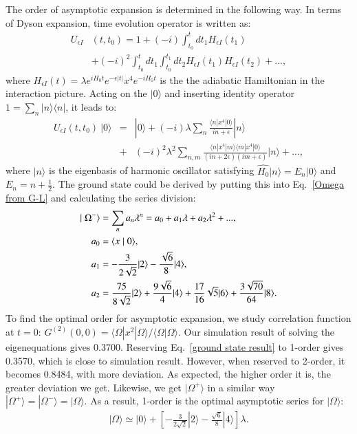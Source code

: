 \documentclass[twocolumn,pra,aps,superscriptaddress]{revtex4-2}
\begin{document}
The order of asymptotic expansion is determined in the following way. In terms of Dyson expansion, time evolution operator is written as:
\begin{align*}
U_{\epsilon I}&(t,t_{0})=1+(-i)\int_{t_{0}}^{t}dt_{1}H_{\epsilon I}(t_{1})
\\
&+(-i)^{2}\int_{t_{0}}^{t}dt_{1}\int_{t_{0}}^{t_{1}}dt_{2}H_{\epsilon I}(t_{1})H_{\epsilon I}(t_{2})+...,
\end{align*} 
where $H_{\epsilon I}(t)=\lambda e^{iH_{0}t}e^{-\epsilon\left|t\right|}x^{4}e^{-iH_{0}t}$ is the the adiabatic Hamiltonian in the interaction picture. Acting on the $|0\rangle$ and inserting identity operator $1=\sum_n |n\rangle \langle n|$, it leads to:
\begin{eqnarray*}
\label{time evolution operator}
U_{\epsilon I}(t,t_{0})~|0\rangle &=& |0\rangle  + (-i)\lambda \sum_n \frac{\langle n |x^4|0\rangle}{in+\epsilon}|n\rangle \nonumber\\&+&(-i)^2 \lambda^2 \sum_{n,m} \frac{\langle n |x^4|m\rangle\langle m |x^4|0\rangle}{\left(in+2\epsilon \right) \left(im+\epsilon \right)}|n\rangle+...,
\end{eqnarray*} 
where $|n\rangle$ is the eigenbasis of harmonic oscillator satisfying $\hat{H_0}|n\rangle=E_n |0\rangle$ and $E_n = n+\frac{1}{2}$. 
The ground state could be derived by putting this into Eq.~\eqref{Omega from G-L} and calculating the series division:
\begin{align}
\label{ground state result}
\mid\Omega^-\rangle &=\sum_{n}a_{n}\lambda^{n}=a_{0}+a_{1}\lambda+a_{2}\lambda^{2}+...,
\notag\\
a_{0} &=\langle x\mid0\rangle,~
\notag\\a_{1} &= -\frac{3}{2\sqrt{2}} |2\rangle -\frac{\sqrt{6}}{8}  |4\rangle ,~
\notag\\a_{2}&= \frac{75}{8\sqrt{2}}|2\rangle + \frac{9\sqrt{6}}{4}|4\rangle + \frac{17}{16}\sqrt{5} |6\rangle + \frac{3\sqrt{70}}{64}|8\rangle.
\end{align} 
To find the optimal order for asymptotic expansion, we study correlation function at $t=0$: $G^{(2)}(0,0)={\langle\Omega|x^2|\Omega\rangle}/{\langle\Omega|\Omega\rangle}$. Our simulation result of solving the eigenequations gives $0.3700$. Reserving Eq.~\eqref{ground state result} to 1-order gives 0.3570, which is close to simulation result. However, when reserved to 2-order, it becomes 0.8484, with more deviation. As expected, the higher order it is, the greater deviation we get. Likewise, we get $|\Omega^+\rangle$  in a similar way $|\Omega^+\rangle=|\Omega^-\rangle=|\Omega\rangle$. As a result, 1-order is the optimal asymptotic series for $|\Omega\rangle$:
\begin{align}
|\Omega\rangle \simeq |0\rangle+\left[-\frac{3}{2\sqrt{2}}|2\rangle-\frac{\sqrt{6}}{8}|4\rangle\right]\lambda.
\end{align}
\end{document}
